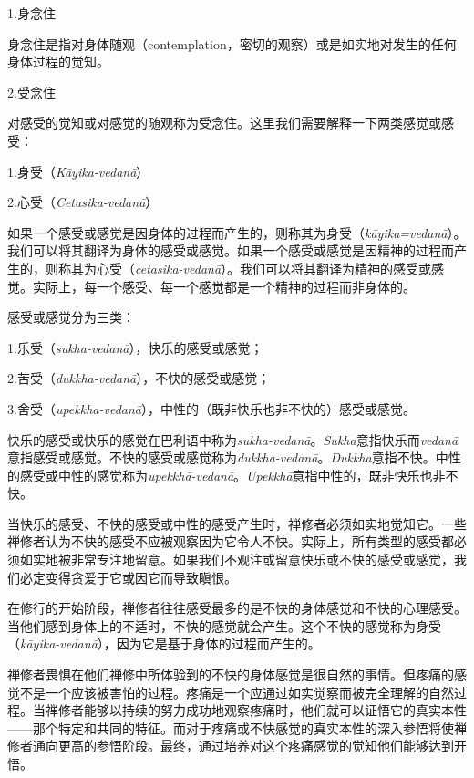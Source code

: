 \sssubsectnon 1.身念住

身念住是指对身体随观（contemplation，密切的观察）或是如实地对发生的任何身体过程的觉知。

\sssubsectnon 2.受念住

对感受的觉知或对感觉的随观称为受念住。这里我们需要解释一下两类感觉或感受：

{
\leftskip=1.6pc
\item{1.}身受（{\it K\=ayika-vedan\=a}）
\item{2.}\1心受（{\it Cetasika-vedan\=a}）

}

如果一个感受或感觉是因身体的过程而产生的，则称其为身受（{\it k\=ayika=vedan\=a}）。我们可以将其翻译为身体的感受或感觉。如果一个感受或感觉是因精神的过程而产生的，则称其为心受（{\it cetasika-vedan\=a}）。我们可以将其翻译为精神的感受或感觉。实际上，每一个感受、每一个感觉都是一个精神的过程而非身体的。

感受或感觉分为三类：

{
\leftskip=1.6pc
\item{1.}乐受（{\it sukha-vedan\=a}），快乐的感受或感觉；
\item{2.}苦受（{\it dukkha-vedan\=a}），不快的感受或感觉；
\item{3.}舍受（{\it upekkha-vedan\=a}），中性的（既非快乐也非不快的）感受或感觉。

}

快乐的感受或快乐的感觉在巴利语中称为{\it sukha-vedan\=a}。{\it Sukha}意指快乐而{\it vedan\=a}意指感受或感觉。不快的感受或感觉称为{\it dukkha-vedan\=a}。{\it Dukkha}意指不快。中性的感受或中性的感觉称为{\it upekkh\=a-vedan\=a}。{\it Upekkh\=a}意指中性的，既非快乐也非不快。

当快乐的感受、不快的感受或中性的感受产生时，禅修者必须如实地觉知它。一些禅修者认为不快的感受不应被观察因为它令人不快。实际上，所有类型的感受都必须如实地被非常专注地留意。如果我们不观注或留意快乐或不快的感受或感觉，我们必定变得贪爱于它或因它而导致瞋恨。

在修行的开始阶段，禅修者往往感受最多的是不快的身体感觉和不快的心理感受。当他们感到身体上的不适时，不快的感觉就会产生。这个\1不快的感觉称为身受（{\it k\=ayika-vedan\=a}），因为它是基于身体的过程而产生的。

禅修者畏惧在他们禅修中所体验到的不快的身体感觉是很自然的事情。但疼痛的感觉不是一个应该被害怕的过程。疼痛是一个应通过如实觉察而被完全理解的自然过程。当禅修者能够以持续的努力成功地观察疼痛时，他们就可以证悟它的真实本性——那个特定和共同的特征。而对于疼痛或不快感觉的真实本性的深入参悟将使禅修者通向更高的参悟阶段。最终，通过培养对这个疼痛感觉的觉知他们能够达到开悟。


